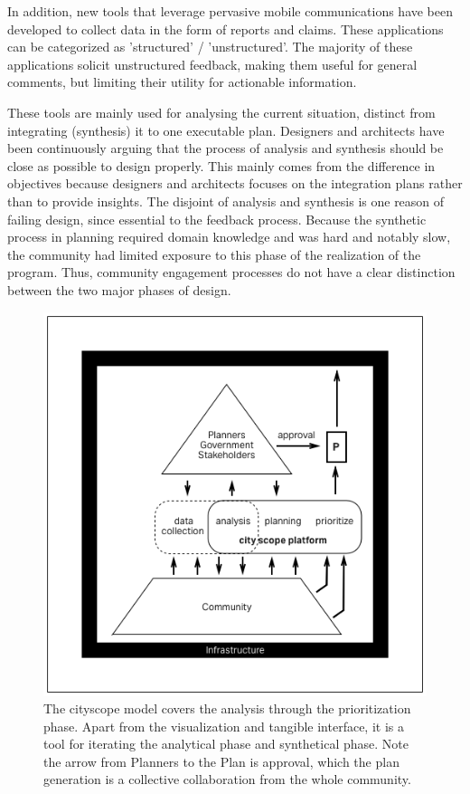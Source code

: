 In addition, new tools that leverage pervasive mobile communications have been developed to collect data in the form of reports and claims. These applications can be categorized as 'structured' / 'unstructured'. The majority of these applications solicit unstructured feedback, making them useful for general comments, but limiting their utility for actionable information.

These tools are mainly used for analysing the current situation, distinct from integrating (synthesis) it to one executable plan. Designers and architects have been continuously arguing that the process of analysis and synthesis should be close as possible to design properly. This mainly comes from the difference in objectives because designers and architects focuses on the integration plans rather than to provide insights. The disjoint of analysis and synthesis is one reason of failing design, since essential to the feedback process. 
Because the synthetic process in planning required domain knowledge and was hard and notably slow, the community had limited exposure to this phase of the realization of the program. Thus, community engagement processes do not have a clear distinction between the two major phases of design.

\begin{figure}[!htb]
 	\includegraphics[width=\textwidth]{chapters/1/fig/cityscope.png}               
 	 \caption[diagram: cityscope model]{The cityscope model covers the analysis through the prioritization phase. Apart from the visualization and tangible interface, it is a tool for iterating the analytical phase and synthetical phase. Note the arrow from Planners to the Plan is approval, which the plan generation is a collective collaboration from the whole community.}
  	\label{fig:diagram_cityscope}
\end{figure}

